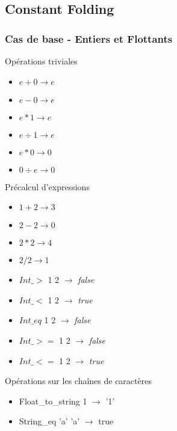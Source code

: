 \documentclass{beamer}
\begin{document}
\subsection{Constant Folding} 

\begin{frame}
\frametitle{Cas de base - Entiers et Flottants}
Opérations triviales 
  \begin{multicols}{3}
  \begin{itemize}
    \item $e + 0 \rightarrow e $
    \item $e - 0 \rightarrow e $
    \item $e * 1 \rightarrow e $
    \item $e \div 1 \rightarrow e $
    \item $e * 0 \rightarrow 0 $
    \item $0 \div e \rightarrow 0 $
  \end{itemize}
  \end{multicols}

Précalcul d'expressions
  \begin{multicols}{2}
  \begin{itemize}
    \item $ 1 + 2 \rightarrow 3 $
    \item $ 2 - 2 \rightarrow 0 $
    \item $ 2 * 2 \rightarrow 4 $
    \item $ 2 / 2 \rightarrow 1 $
    \item $ Int\_>$ 1 2 $\rightarrow$ \emph{false}
    \item $ Int\_<$ 1 2 $\rightarrow$ \emph{true}
    \item $ Int\_eq$ 1 2 $\rightarrow$ \emph{false}
    \item $ Int\_>=$ 1 2 $\rightarrow$ \emph{false}
    \item $ Int\_<=$ 1 2 $\rightarrow$ \emph{true}
  \end{itemize}
  \end{multicols}

Opérations sur les chaînes de caractères
  \begin{multicols}{2}
  \begin{itemize}
    \item Float\_to\_string 1 $\rightarrow$ '1'
    \item String\_eq 'a' 'a' $\rightarrow$ true 
  \end{itemize}
  \end{multicols}

\end{frame}
\end{document}
